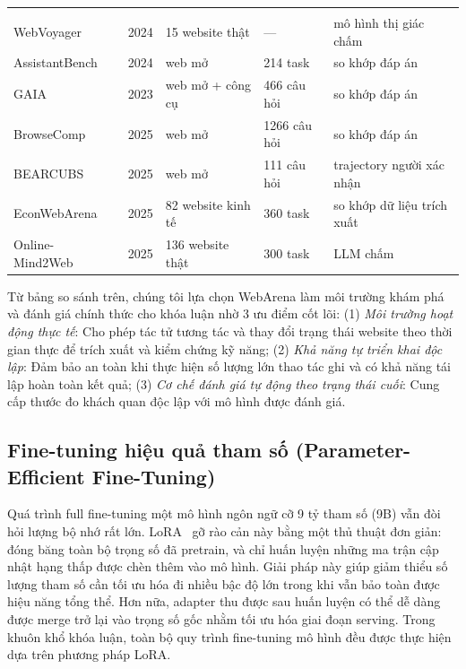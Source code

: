 \begin{table}[htbp]
\begin{tabular}{@{}L{3.1cm} C{0.9cm} L{2.7cm} L{3.0cm} L{3.6cm}@{}}
\addlinespace
{} \\
WebVoyager~\cite{he2024webvoyager} & 2024 & 15 website thật & --- & mô hình thị giác chấm \\
AssistantBench~\cite{yoran2024assistantbench} & 2024 & web mở & 214 task & so khớp đáp án \\
GAIA~\cite{mialon2024gaia} & 2023 & web mở + công cụ & 466 câu hỏi & so khớp đáp án \\
BrowseComp~\cite{wei2025browsecomp} & 2025 & web mở & 1266 câu hỏi & so khớp đáp án \\
BEARCUBS~\cite{song2025bearcubs} & 2025 & web mở & 111 câu hỏi & trajectory người xác nhận \\
EconWebArena~\cite{liu2025econwebarena} & 2025 & 82 website kinh tế & 360 task & so khớp dữ liệu trích xuất \\
Online-Mind2Web~\cite{xue2025illusion} & 2025 & 136 website thật & 300 task & LLM chấm \\
\bottomrule
\end{tabular}
\end{table}

Từ bảng so sánh trên, chúng tôi lựa chọn WebArena làm môi trường khám phá và đánh giá chính thức cho khóa luận nhờ 3 ưu điểm cốt lõi:
(1) \emph{Môi trường hoạt động thực tế}: Cho phép tác tử tương tác và thay đổi trạng thái website theo thời gian thực để trích xuất và kiểm chứng kỹ năng;
(2) \emph{Khả năng tự triển khai độc lập}: Đảm bảo an toàn khi thực hiện số lượng lớn thao tác ghi và có khả năng tái lập hoàn toàn kết quả;
(3) \emph{Cơ chế đánh giá tự động theo trạng thái cuối}: Cung cấp thước đo khách quan độc lập với mô hình được đánh giá.

\subsection{Fine-tuning hiệu quả tham số (Parameter-Efficient Fine-Tuning)}

Quá trình full fine-tuning một mô hình ngôn ngữ cỡ 9
tỷ tham số (9B) vẫn đòi hỏi lượng bộ nhớ rất lớn. LoRA~\cite{hu2022lora} gỡ rào cản này bằng một thủ thuật đơn giản: đóng băng toàn bộ trọng số đã pretrain, và chỉ huấn luyện những ma trận cập nhật hạng thấp được chèn thêm vào mô hình. Giải pháp này giúp giảm
thiểu số lượng tham số cần tối ưu hóa đi nhiều bậc độ lớn trong khi vẫn
bảo toàn được hiệu năng tổng thể. Hơn nữa, adapter thu được sau huấn luyện có thể dễ dàng được merge trở lại vào
trọng số gốc nhằm tối ưu hóa giai đoạn serving. Trong
khuôn khổ khóa luận, toàn bộ quy trình fine-tuning mô hình đều được thực
hiện dựa trên phương pháp LoRA.

